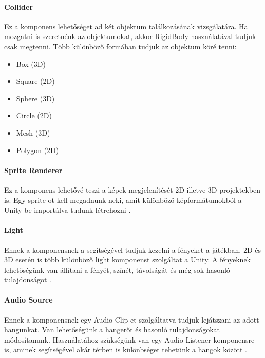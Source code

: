 \documentclass[]{thesis-ekf}
\theoremstyle{definition}
\theoremstyle{remark}
\begin{document}
\paragraph{Collider}

Ez a komponens lehetőséget ad két objektum találkozásának vizsgálatára. Ha mozgatni is szeretnénk az objektumokat, akkor RigidBody használatával tudjuk csak megtenni. Több különböző formában tudjuk az objektum köré tenni: \cite{UnityCollider}

\begin{itemize}
	\item Box (3D)
	\item Square (2D)
	\item Sphere (3D)
	\item Circle (2D)
	\item Mesh (3D)
	\item Polygon (2D)
\end{itemize}

\paragraph{Sprite Renderer}

Ez a komponens lehetővé teszi a képek megjelenítését 2D illetve 3D projektekben is. Egy sprite-ot kell megadnunk neki, amit különböző képformátumokból a Unity-be importálva tudunk létrehozni \cite{UnitySpriteRenderer}.

\paragraph{Light}

Ennek a komponensnek a segítségével tudjuk kezelni a fényeket a játékban. 2D és 3D esetén is több különböző light komponenst szolgáltat a Unity. A fényeknek lehetőségünk van állítani a fényét, színét, távolságát és még sok hasonló tulajdonságot \cite{UnityLight}.

\paragraph{Audio Source}

Ennek a komponensnek egy Audio Clip-et szolgáltatva tudjuk lejátszani az adott hangunkat. Van lehetőségünk a hangerőt és hasonló tulajdonságokat módosítanunk. Használatához szükségünk van egy Audio Listener komponensre is, aminek segítségével akár térben is különbséget tehetünk a hangok között \cite{UnityAudioSource}.
\end{document}
